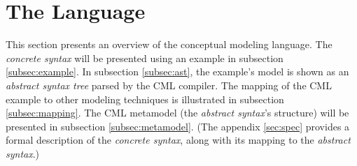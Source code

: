 \section{The Language}\label{sec:lang}
%
This section presents an overview of the conceptual modeling language.
The \emph{concrete syntax} will be presented using an example in subsection \ref{subsec:example}. 
In subsection \ref{subsec:ast},
the example's model is shown as an \emph{abstract syntax tree} parsed by the CML compiler.
The mapping of the CML example to other modeling techniques is illustrated in subsection \ref{subsec:mapping}.
The CML metamodel (the \emph{abstract syntax}'s structure) will be presented in subsection \ref{subsec:metamodel}. 
(The appendix \ref{sec:spec} provides a formal description of the \emph{concrete syntax},
along with its mapping to the \emph{abstract syntax}.)






